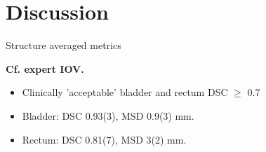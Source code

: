 \documentclass[9pt]{beamer}
\begin{document}
\section{Discussion}
\begin{frame}{Structure averaged metrics}


\vspace{4mm}

\vspace{4mm}
\textbf{Cf. expert IOV.}\footnotemark[2]
\begin{itemize}
\item Clinically 'acceptable' bladder and rectum DSC $\geq$ 0.7
\item Bladder:  DSC 0.93(3), MSD 0.9(3) mm.
\item Rectum:  DSC 0.81(7), MSD 3(2) mm.
\end{itemize}
\end{frame}
%
%
%

\end{document}

